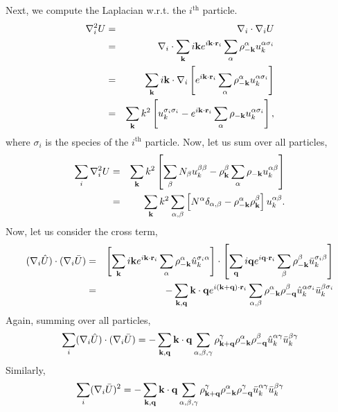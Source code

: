 \documentclass{article}
\begin{document}
Next, we compute the Laplacian w.r.t. the $i^{\text{th}}$ particle.
\begin{eqnarray}
\nabla^2_i U & = & \nabla_i \cdot \nabla_i U \\
& = & \nabla_i \cdot \sum_{\mathbf{k}} i\mathbf{k} e^{i\mathbf{k} \cdot \mathbf{r}_i} \sum_\alpha
\rho_{-\mathbf{k}}^\alpha u^{\alpha \sigma_i}_k \\
& = & \sum_{\mathbf{k}} i\mathbf{k} \cdot \nabla_i \left[ e^{i\mathbf{k} \cdot \mathbf{r}_i}
  \sum_\alpha \rho_{-\mathbf{k}}^\alpha u^{\alpha\sigma_i}_k \right] \\
& = & \sum_{\mathbf{k}} k^2 \left[ u^{\sigma_i \sigma_i}_k - e^{i\mathbf{k}\cdot\mathbf{r}_i}\sum_\alpha \rho_{-\mathbf{k}}
u_k^{\alpha \sigma_i}\right],
\end{eqnarray}
where $\sigma_i$ is the species of the $i^{\text{th}}$ particle.  Now,
let us sum over all particles,
\begin{eqnarray}
\sum_i \nabla^2_i U & = & \sum_{\mathbf{k}} k^2 \left[\sum_\beta N_\beta u_k^{\beta
  \beta} - \rho_{\mathbf{k}}^\beta \sum_\alpha \rho_{-\mathbf{k}} u_k^{\alpha \beta}
  \right] \\
& = & \sum_{\mathbf{k}} k^2 \sum_{\alpha, \beta}
  \left[N^{\alpha}\delta_{\alpha,\beta} -
  \rho_{-\mathbf{k}}^{\alpha}\rho_{\mathbf{k}}^\beta \right]u_k^{\alpha \beta}.
\end{eqnarray}
Now, let us consider the cross term,
\begin{eqnarray}
(\nabla_i \hat{U}) \cdot ( \nabla_i \bar{U} ) 
& = & \left[\sum_{\mathbf{k}} i\mathbf{k} e^{i\mathbf{k}\cdot \mathbf{r}_i} \sum_\alpha
  \rho_{-\mathbf{k}}^\alpha \hat{u}^{\sigma_i \alpha}_k \right] \cdot
\left[\sum_{\mathbf{q}} i\mathbf{q} e^{i\mathbf{q}\cdot \mathbf{r}_i} \sum_\beta
  \rho_{-\mathbf{k}}^\beta \bar{u}^{\sigma_i \beta}_k \right] \nonumber \\
& = & -\sum_{\mathbf{k},\mathbf{q}} \mathbf{k} \cdot \mathbf{q} e^{i(\mathbf{k} + \mathbf{q})\cdot \mathbf{r}_i}
\sum_{\alpha, \beta} \rho_{-\mathbf{k}}^\alpha \rho_{-\mathbf{q}}^\beta 
\hat{u}^{\alpha \sigma_i}_k \bar{u}^{\beta \sigma_i}_k
\end{eqnarray}
Again, summing over all particles,
\begin{equation}
\sum_i (\nabla_i \hat{U}) \cdot ( \nabla_i \bar{U} ) =
-\sum_{\mathbf{k}, \mathbf{q}} \mathbf{k} \cdot \mathbf{q} \sum_{\alpha, \beta, \gamma}
\rho_{\mathbf{k} + \mathbf{q}}^\gamma \rho_{-\mathbf{k}}^{\alpha} \rho_{-\mathbf{q}}^\beta
\hat{u}^{\alpha \gamma}_k \bar{u}^{\beta \gamma}_k
\end{equation}
Similarly,
\begin{equation}
\sum_i (\nabla_i \bar{U})^2 = -\sum_{\mathbf{k}, \mathbf{q}} \mathbf{k} \cdot \mathbf{q} 
\sum_{\alpha, \beta, \gamma} \rho^\gamma_{\mathbf{k}+\mathbf{q}} \rho^\alpha_{-\mathbf{k}}
\rho^\gamma_{-\mathbf{q}} \bar{u}^{\alpha \gamma}_k \bar{u}^{\beta \gamma}_k
\end{equation}
\end{document}
